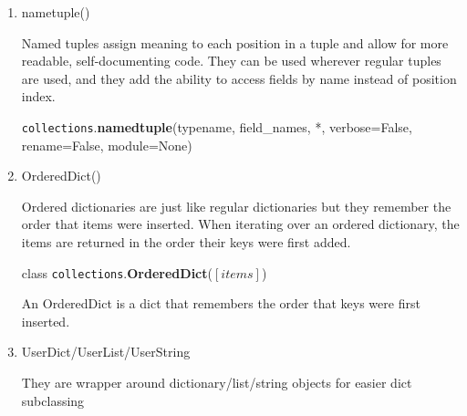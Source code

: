 \begin{enumerate}
\item nametuple()

Named tuples assign meaning to each position in a tuple and allow for more readable, self-documenting code. They can be used wherever regular tuples are used, and they add the ability to access fields by name instead of position index.

\texttt{collections}.\textbf{namedtuple}(typename, field\_names, *, verbose=False, rename=False, module=None)

\item OrderedDict()

Ordered dictionaries are just like regular dictionaries but they remember the order that items were inserted. When iterating over an ordered dictionary, the items are returned in the order their keys were first added.

class \texttt{collections}.\textbf{OrderedDict}($[items]$)

An OrderedDict is a dict that remembers the order that keys were first inserted.

\item UserDict/UserList/UserString

They are wrapper around dictionary/list/string objects for easier dict subclassing
\end{enumerate}